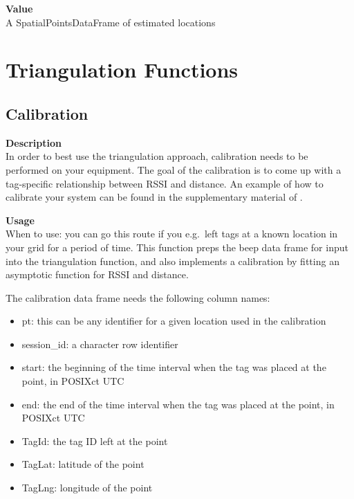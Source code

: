 \documentclass[
]{book}
\providecommand{\tightlist}{%
  \setlength{\itemsep}{0pt}\setlength{\parskip}{0pt}}
\begin{document}
\textbf{Value}\\
A SpatialPointsDataFrame of estimated locations

\hypertarget{triangulation-functions}{%
\section{Triangulation Functions}\label{triangulation-functions}}

\hypertarget{calibration}{%
\subsection{Calibration}\label{calibration}}

\textbf{Description}\\
In order to best use the triangulation approach, calibration needs to be performed on your equipment. The goal of the calibration is to come up with a tag-specific relationship between RSSI and distance. An example of how to calibrate your system can be found in the supplementary material of \citet{bircher2020extraterritorial} .

\textbf{Usage}\\
When to use: you can go this route if you e.g.~left tags at a known location in your grid for a period of time. This function preps the beep data frame for input into the triangulation function, and also implements a calibration by fitting an asymptotic function for RSSI and distance.

The calibration data frame needs the following column names:

\begin{itemize}
\tightlist
\item
  pt: this can be any identifier for a given location used in the calibration\\
\item
  session\_id: a character row identifier
\item
  start: the beginning of the time interval when the tag was placed at the point, in POSIXct UTC\\
\item
  end: the end of the time interval when the tag was placed at the point, in POSIXct UTC\\
\item
  TagId: the tag ID left at the point\\
\item
  TagLat: latitude of the point\\
\item
  TagLng: longitude of the point
\end{itemize}
\end{document}
